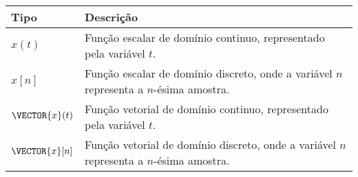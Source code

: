 \begin{notation}~\\
\begin{tabular}{p{} | p{} }
\hline	
\textbf{Tipo}            & \textbf{Descrição} \\ \hline
$x(t)$          & Função escalar de domínio continuo, representado pela variável $t$. \\ \hline
$x[n]$          & Função escalar de domínio discreto, onde a variável $n$ representa a $n$-ésima amostra. \\ \hline
$\VECTOR{x}(t)$ & Função vetorial de domínio continuo, representado pela variável $t$.  \\ \hline
$\VECTOR{x}[n]$ & Função vetorial de domínio discreto, onde a variável $n$ representa a $n$-ésima amostra. \\
\hline
\end{tabular}
\end{notation}

